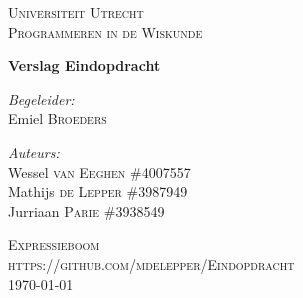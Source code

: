 \documentclass[12pt]{article}
\begin{document}
\begin{titlepage}
\begin{center}

\textsc{\LARGE Universiteit Utrecht}\\[1.6cm]

\textsc{\Large Programmeren in de Wiskunde}\vspace{2pc}

{\huge \bfseries Verslag Eindopdracht}
\vspace{3pc}

\begin{minipage}{0.7\textwidth}
\begin{flushleft} \large
\emph{Begeleider:} \\
Emiel \textsc{Broeders} 
\end{flushleft}
\begin{flushleft} \large
\emph{Auteurs:}\\
Wessel \textsc{van Eeghen} \tab\#4007557\\
Mathijs \textsc{de Lepper}  \tab\#3987949\\
Jurriaan \textsc{Parie}  \tab\tab\#3938549
\end{flushleft}
\end{minipage}
\begin{minipage}{0.4\textwidth}
\end{minipage}
\vspace{10pc} 

\textsc{\Large Expressieboom}\\[1.0cm]
\textsc{https://github.com/mdelepper/Eindopdracht}\\[2.5cm]
{\large \today}
\end{center}
\end{titlepage}

\newpage
\end{document}

